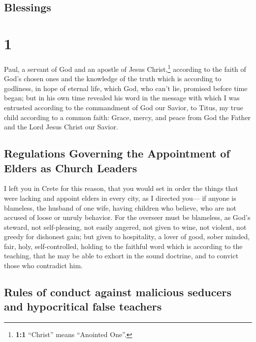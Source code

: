 \hypertarget{blessings}{%
\subsection{Blessings}\label{blessings}}

\hypertarget{section}{%
\section{1}\label{section}}

 Paul, a servant of God and an apostle of Jesus
Christ,\footnote{\textbf{1:1} ``Christ'' means ``Anointed One''.}
according to the faith of God's chosen ones and the knowledge of the
truth which is according to godliness,  in hope of eternal
life, which God, who can't lie, promised before time began;
 but in his own time revealed his word in the message with
which I was entrusted according to the commandment of God our Savior,
 to Titus, my true child according to a common faith:
Grace, mercy, and peace from God the Father and the Lord Jesus Christ
our Savior.

\hypertarget{regulations-governing-the-appointment-of-elders-as-church-leaders}{%
\subsection{Regulations Governing the Appointment of Elders as Church
Leaders}\label{regulations-governing-the-appointment-of-elders-as-church-leaders}}

 I left you in Crete for this reason, that you would set
in order the things that were lacking and appoint elders in every city,
as I directed you---  if anyone is blameless, the husband
of one wife, having children who believe, who are not accused of loose
or unruly behavior.  For the overseer must be blameless,
as God's steward, not self-pleasing, not easily angered, not given to
wine, not violent, not greedy for dishonest gain;  but
given to hospitality, a lover of good, sober minded, fair, holy,
self-controlled,  holding to the faithful word which is
according to the teaching, that he may be able to exhort in the sound
doctrine, and to convict those who contradict him.

\hypertarget{rules-of-conduct-against-malicious-seducers-and-hypocritical-false-teachers}{%
\subsection{Rules of conduct against malicious seducers and hypocritical
false
teachers}\label{rules-of-conduct-against-malicious-seducers-and-hypocritical-false-teachers}}

